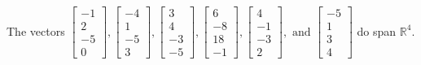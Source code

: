 \begin{exercise}
\begin{exerciseStatement}
  \end{exerciseStatement}
  \begin{exerciseAnswer}
   The vectors \(\left[\begin{array}{r}
-1 \\
2 \\
-5 \\
0
\end{array}\right] , \left[\begin{array}{r}
-4 \\
1 \\
-5 \\
3
\end{array}\right] , \left[\begin{array}{r}
3 \\
4 \\
-3 \\
-5
\end{array}\right] , \left[\begin{array}{r}
6 \\
-8 \\
18 \\
-1
\end{array}\right] , \left[\begin{array}{r}
4 \\
-1 \\
-3 \\
2
\end{array}\right] , \text{ and } \left[\begin{array}{r}
-5 \\
1 \\
3 \\
4
\end{array}\right]\) 
  	 do  
	span \(\mathbb{R}^4\).
  


  \end{exerciseAnswer}
\end{exercise}